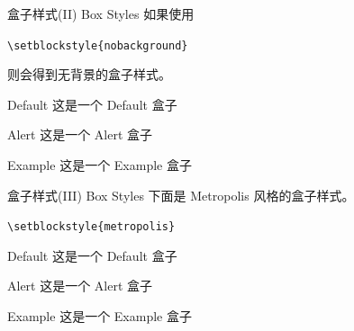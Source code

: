 \documentclass[10pt,aspectratio=169,fontset=none]{ctexbeamer}
\begin{document}
    \begin{frame}{盒子样式(II) Box Styles}
    如果使用    

        \begin{center}
            \texttt{\textcolor{primary}{\textbackslash setblockstyle}\{nobackground\}}
        \end{center}
    则会得到无背景的盒子样式。
        \centering
        \begin{minipage}[b]{0.5\textwidth}
            \begin{block}{Default}
                这是一个 Default 盒子
            \end{block}
            \begin{alertblock}{Alert}
                这是一个 Alert 盒子
            \end{alertblock}
            \begin{exampleblock}{Example}
                这是一个 Example 盒子
            \end{exampleblock}       
        \end{minipage}

    \end{frame}

    \begin{frame}{盒子样式(III) Box Styles}
    下面是 Metropolis 风格的盒子样式。    

        \begin{center}
            \texttt{\textcolor{primary}{\textbackslash setblockstyle}\{metropolis\}}
        \end{center}

        \centering
        \begin{minipage}[b]{0.5\textwidth}
            \begin{block}{Default}
                这是一个 Default 盒子
            \end{block}
            \begin{alertblock}{Alert}
                这是一个 Alert 盒子
            \end{alertblock}
            \begin{exampleblock}{Example}
                这是一个 Example 盒子
            \end{exampleblock}       
        \end{minipage}

    \end{frame}
\end{document}
